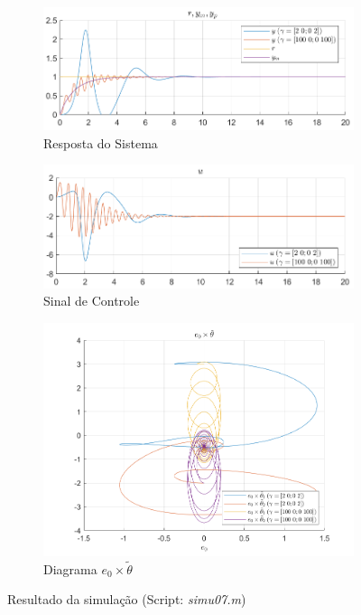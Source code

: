 \documentclass[10pt]{article}
\begin{document}
\begin{figure}[h!]
    \begin{subfigure}[b]{0.45\textwidth}
        \centering
        \includegraphics[width=\textwidth]{img/fig07c.png}
        \caption{Resposta do Sistema}
    \end{subfigure}
    \begin{subfigure}[b]{0.45\textwidth}
        \centering
        \includegraphics[width=\textwidth]{img/fig07e.png}
        \caption{Sinal de Controle}
    \end{subfigure}

    \vspace{0.5cm}

    \begin{subfigure}[b]{0.4\textwidth}
        \centering
        \includegraphics[width=\textwidth]{img/fig07d.png}
        \caption{Diagrama $e_0 \times \tilde{\theta}$}
    \end{subfigure}

    \caption{Resultado da simulação (Script: \textit{simu07.m})}
    \label{fig:sim7}
\end{figure}
\end{document}
